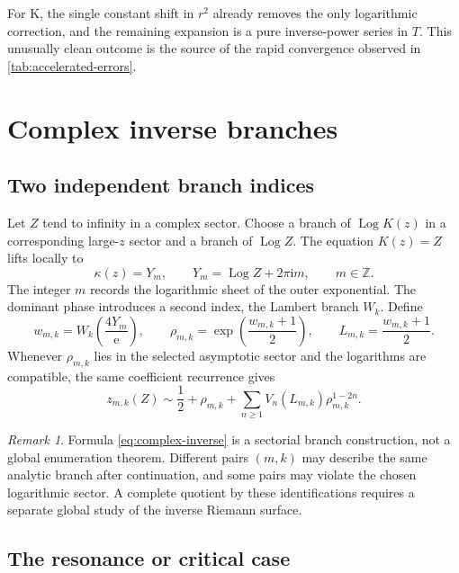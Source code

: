 \documentclass[11pt,a4paper]{article}
\numberwithin{equation}{section}
\theoremstyle{remark}
\newtheorem{remark}[theorem]{Remark}
\DeclareMathOperator{\Log}{Log}
\newcommand{\e}{\mathrm e}
\newcommand{\ii}{\mathrm i}
\begin{document}
For K, the single constant shift in \(r^2\) already removes the only
logarithmic correction, and the remaining expansion is a pure inverse-power
series in \(T\).  This unusually clean outcome is the source of the rapid
convergence observed in \cref{tab:accelerated-errors}.

\section{Complex inverse branches}
\label{sec:complex-branches}

\subsection{Two independent branch indices}

Let \(Z\) tend to infinity in a complex sector.  Choose a branch of
\(\Log K(z)\) in a corresponding large-\(z\) sector and a branch of
\(\Log Z\).  The equation \(K(z)=Z\) lifts locally to
\begin{equation}
\kappa(z)=Y_m,
\qquad
Y_m=\Log Z+2\pi\ii m,
\qquad m\in\mathbb Z.
\label{eq:Y-m}
\end{equation}
The integer \(m\) records the logarithmic sheet of the outer exponential.
The dominant phase introduces a second index, the Lambert branch \(W_k\).
Define
\begin{equation}
w_{m,k}=W_k\!\left(\frac{4Y_m}{\e}\right),
\qquad
\rho_{m,k}=\exp\!\left(\frac{w_{m,k}+1}{2}\right),
\qquad
L_{m,k}=\frac{w_{m,k}+1}{2}.
\label{eq:complex-rho}
\end{equation}
Whenever \(\rho_{m,k}\) lies in the selected asymptotic sector and the
logarithms are compatible, the same coefficient recurrence gives
\begin{equation}
z_{m,k}(Z)\sim
\frac12+\rho_{m,k}+
\sum_{n\ge1}V_n(L_{m,k})\rho_{m,k}^{1-2n}.
\label{eq:complex-inverse}
\end{equation}

\begin{remark}
Formula \cref{eq:complex-inverse} is a sectorial branch construction, not a
global enumeration theorem.  Different pairs \((m,k)\) may describe the
same analytic branch after continuation, and some pairs may violate the
chosen logarithmic sector.  A complete quotient by these identifications
requires a separate global study of the inverse Riemann surface.
\end{remark}

\subsection{The resonance or critical case}
\end{document}
